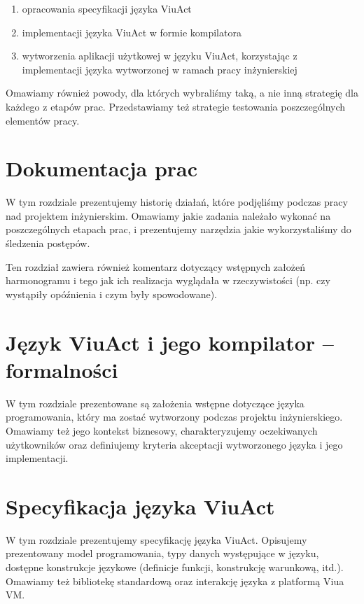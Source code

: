 \documentclass[11pt,oneside,a4paper,titlepage,onecolumn]{book}
\begin{document}
\begin{enumerate}
    \item opracowania specyfikacji języka ViuAct
    \item implementacji języka ViuAct w formie kompilatora
    \item wytworzenia aplikacji użytkowej w języku ViuAct, korzystając z implementacji języka wytworzonej w
        ramach pracy inżynierskiej
\end{enumerate}

Omawiamy również powody, dla których wybraliśmy taką, a nie inną strategię dla każdego z etapów prac.
Przedstawiamy też strategie testowania poszczególnych elementów pracy.

\section{Dokumentacja prac}

W tym rozdziale prezentujemy historię działań, które podjęliśmy podczas pracy nad projektem inżynierskim.
Omawiamy jakie zadania należało wykonać na poszczególnych etapach prac, i prezentujemy narzędzia jakie
wykorzystaliśmy do śledzenia postępów.

Ten rozdział zawiera również komentarz dotyczący wstępnych założeń harmonogramu i tego jak ich realizacja
wyglądała w rzeczywistości (np. czy wystąpiły opóźnienia i czym były spowodowane).


\section{Język ViuAct i jego kompilator -- formalności}

W tym rozdziale prezentowane są założenia wstępne dotyczące języka programowania, który ma zostać wytworzony
podczas projektu inżynierskiego. Omawiamy też jego kontekst biznesowy, charakteryzujemy oczekiwanych
użytkowników oraz definiujemy kryteria akceptacji wytworzonego języka i jego implementacji.

\section{Specyfikacja języka ViuAct}

W tym rozdziale prezentujemy specyfikację języka ViuAct. Opisujemy prezentowany model programowania, typy
danych występujące w języku, dostępne konstrukcje językowe (definicje funkcji, konstrukcję warunkową,
itd.). Omawiamy też bibliotekę standardową oraz interakcję języka z platformą Viua VM.
\end{document}

